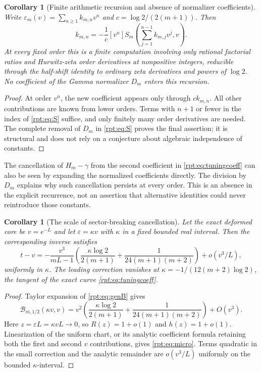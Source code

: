 \documentclass[11pt,a4paper]{article}
\numberwithin{equation}{section}
\newtheorem{corollary}[theorem]{Corollary}
\theoremstyle{definition}\newtheorem{definition}[theorem]{Definition}
\theoremstyle{remark}\newtheorem{remark}[theorem]{Remark}
\newcommand{\eps}{\varepsilon}
\newcommand{\calB}{\mathscr B}
\newcommand{\coef}[2]{[#1^{#2}]}
\begin{document}
\begin{corollary}[Finite arithmetic recursion and absence of normalizer coefficients]
\label{rpt:cor:tunerec}
Write $\eps_m(v)=\sum_{n\ge1}k_{m,n}v^n$ and $c=\log2/(2(m+1))$. Then
\begin{equation}
k_{m,n}=-\frac1c\coef{v}{n}
S_m\left(\sum_{j=1}^{n-1}k_{m,j}v^j,v\right).
\label{rpt:eq:tunerec}
\end{equation}
At every fixed order this is a finite computation involving only rational factorial ratios and Hurwitz-zeta order derivatives at nonpositive integers, reducible through the half-shift identity to ordinary zeta derivatives and powers of $\log2$. No coefficient of the Gamma normalizer $D_m$ enters this recursion.
\end{corollary}
\begin{proof}
At order $v^n$, the new coefficient appears only through $c k_{m,n}$. All other contributions are known from lower orders. Terms with $n+1$ or fewer in the index of \eqref{rpt:eq:S} suffice, and only finitely many order derivatives are needed. The complete removal of $D_m$ in \eqref{rpt:eq:S} proves the final assertion; it is structural and does not rely on a conjecture about algebraic independence of constants.
\end{proof}

The cancellation of $H_m-\gamma$ from the second coefficient in \eqref{rpt:eq:tuningcoeff} can also be seen by expanding the normalized coefficients directly. The division by $D_m$ explains why such cancellation persists at every order. This is an absence in the explicit recurrence, not an assertion that alternative identities could never reintroduce those constants.

\begin{corollary}[The scale of sector-breaking cancellation]
\label{rpt:cor:micro}
Let the exact deformed core be $v=e^{-L}$ and let $\eps=\kappa v$ with $\kappa$ in a fixed bounded real interval. Then the corresponding inverse satisfies
\begin{equation}
t-v=-\frac{v^3}{mL-1}
\left(\frac{\kappa\log2}{2(m+1)}
+\frac{1}{24(m+1)(m+2)}\right)+o(v^3/L),
\label{rpt:eq:micro}
\end{equation}
uniformly in $\kappa$. The leading correction vanishes at
$\kappa=-1/(12(m+2)\log2)$, the tangent of the exact curve \eqref{rpt:eq:tuningcoeff}.
\end{corollary}
\begin{proof}
Taylor expansion of \eqref{rpt:eq:genB} gives
\[
\calB_{m,1/2}(\kappa v,v)
=v^2\left(\frac{\kappa\log2}{2(m+1)}
+\frac{1}{24(m+1)(m+2)}\right)+O(v^3).
\]
Here $z=\eps L=\kappa vL\to0$, so $R(z)=1+o(1)$ and $h(z)=1+o(1)$. Linearization of the uniform chart, or its analytic coefficient formula retaining both the first and second $v$ contributions, gives \eqref{rpt:eq:micro}. Terms quadratic in the small correction and the analytic remainder are $o(v^3/L)$ uniformly on the bounded $\kappa$-interval.
\end{proof}
\end{document}
